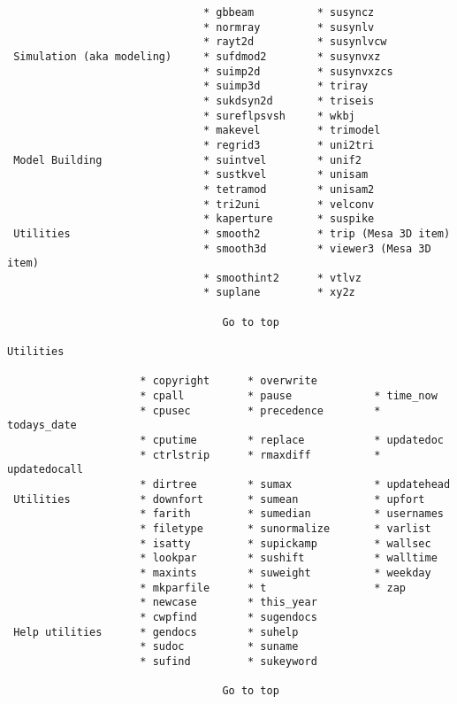 {\begin{verbatim}
                               * gbbeam          * susyncz
                               * normray         * susynlv
                               * rayt2d          * susynlvcw
 Simulation (aka modeling)     * sufdmod2        * susynvxz
                               * suimp2d         * susynvxzcs
                               * suimp3d         * triray
                               * sukdsyn2d       * triseis
                               * sureflpsvsh     * wkbj
                               * makevel         * trimodel
                               * regrid3         * uni2tri
 Model Building                * suintvel        * unif2
                               * sustkvel        * unisam
                               * tetramod        * unisam2
                               * tri2uni         * velconv
                               * kaperture       * suspike
 Utilities                     * smooth2         * trip (Mesa 3D item)
                               * smooth3d        * viewer3 (Mesa 3D item)
                               * smoothint2      * vtlvz
                               * suplane         * xy2z

                                  Go to top

Utilities

                     * copyright      * overwrite
                     * cpall          * pause             * time_now
                     * cpusec         * precedence        * todays_date
                     * cputime        * replace           * updatedoc
                     * ctrlstrip      * rmaxdiff          * updatedocall
                     * dirtree        * sumax             * updatehead
 Utilities           * downfort       * sumean            * upfort
                     * farith         * sumedian          * usernames
                     * filetype       * sunormalize       * varlist
                     * isatty         * supickamp         * wallsec
                     * lookpar        * sushift           * walltime
                     * maxints        * suweight          * weekday
                     * mkparfile      * t                 * zap
                     * newcase        * this_year
                     * cwpfind        * sugendocs
 Help utilities      * gendocs        * suhelp
                     * sudoc          * suname
                     * sufind         * sukeyword

                                  Go to top



\end{verbatim}}

